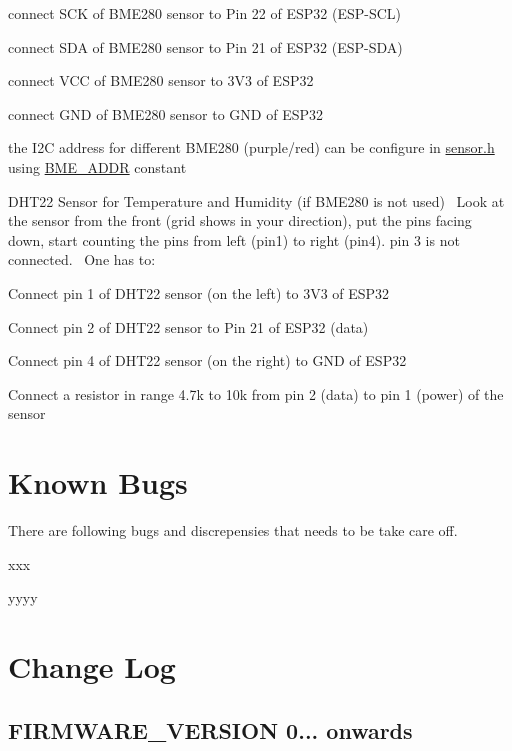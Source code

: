 \begin{DoxyEnumerate}
\begin{DoxyItemize}
\item connect S\+CK of B\+M\+E280 sensor to Pin 22 of E\+S\+P32 (E\+S\+P-\/\+S\+CL)
\item connect S\+DA of B\+M\+E280 sensor to Pin 21 of E\+S\+P32 (E\+S\+P-\/\+S\+DA)
\item connect V\+CC of B\+M\+E280 sensor to 3V3 of E\+S\+P32
\item connect G\+ND of B\+M\+E280 sensor to G\+ND of E\+S\+P32
\item the I2C address for different B\+M\+E280 (purple/red) can be configure in \mbox{\hyperlink{sensor_8h}{sensor.\+h}} using \mbox{\hyperlink{sensor_8h_a9f6149e98e70e1d5be5f0f33921cb7d7}{B\+M\+E\+\_\+\+A\+D\+DR}} constant
\end{DoxyItemize}
\item D\+H\+T22 Sensor for Temperature and Humidity (if B\+M\+E280 is not used)~\newline
 Look at the sensor from the front (grid shows in your direction), put the pins facing down, start counting the pins from left (pin1) to right (pin4). pin 3 is not connected.~\newline
 One has to\+:
\begin{DoxyItemize}
\item Connect pin 1 of D\+H\+T22 sensor (on the left) to 3V3 of E\+S\+P32
\item Connect pin 2 of D\+H\+T22 sensor to Pin 21 of E\+S\+P32 (data)
\item Connect pin 4 of D\+H\+T22 sensor (on the right) to G\+ND of E\+S\+P32
\item Connect a resistor in range 4.\+7k to 10k from pin 2 (data) to pin 1 (power) of the sensor
\end{DoxyItemize}
\end{DoxyEnumerate}\hypertarget{index_knownbugs}{}\section{Known Bugs}\label{index_knownbugs}
There are following bugs and discrepensies that needs to be take care off.
\begin{DoxyEnumerate}
\item xxx
\item yyyy
\end{DoxyEnumerate}\hypertarget{index_changelog}{}\section{Change Log}\label{index_changelog}
\hypertarget{index_changelog2}{}\subsection{F\+I\+R\+M\+W\+A\+R\+E\+\_\+\+V\+E\+R\+S\+I\+O\+N 0... onwards}\label{index_changelog2}


